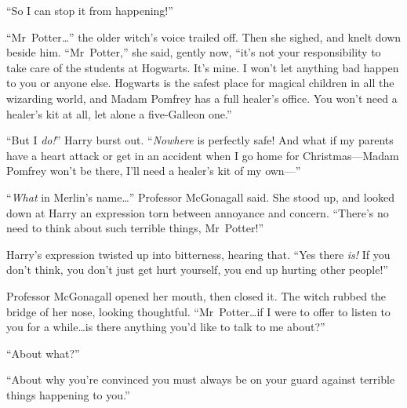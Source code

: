 “So I can stop it from happening!”

“Mr~Potter…” the older witch’s voice trailed off. Then she sighed, and knelt down beside him. “Mr~Potter,” she said, gently now, “it’s not your responsibility to take care of the students at Hogwarts. It’s mine. I won’t let anything bad happen to you or anyone else. Hogwarts is the safest place for magical children in all the wizarding world, and Madam Pomfrey has a full healer’s office. You won’t need a healer’s kit at all, let alone a five-Galleon one.”

“But I \emph{do!}” Harry burst out. “\emph{Nowhere} is perfectly safe! And what if my parents have a heart attack or get in an accident when I go home for Christmas—Madam Pomfrey won’t be there, I’ll need a healer’s kit of my own—”

“\emph{What} in Merlin’s name…” Professor McGonagall said. She stood up, and looked down at Harry an expression torn between annoyance and concern. “There’s no need to think about such terrible things, Mr~Potter!”

Harry’s expression twisted up into bitterness, hearing that. “Yes there \emph{is!} If you don’t think, you don’t just get hurt yourself, you end up hurting other people!”

Professor McGonagall opened her mouth, then closed it. The witch rubbed the bridge of her nose, looking thoughtful. “Mr~Potter…if I were to offer to listen to you for a while…is there anything you’d like to talk to me about?”

“About what?”

“About why you’re convinced you must always be on your guard against terrible things happening to you.”

